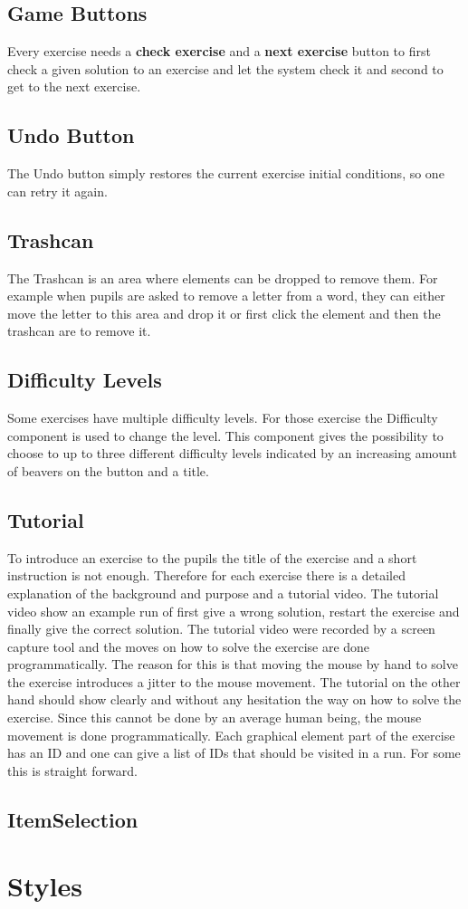 \subsection*{Game Buttons}
Every exercise needs a \textbf{check exercise} and a \textbf{next exercise} button to first check a given solution to an exercise and let the system check it and second to get to the next exercise.

\subsection*{Undo Button}
The Undo button simply restores the current exercise initial conditions, so one can retry it again.

\subsection*{Trashcan}
The Trashcan is an area where elements can be dropped to remove them. For example when pupils are asked to remove a letter from a word, they can either move the letter to this area and drop it or first click the element and then the trashcan are to remove it.

\subsection*{Difficulty Levels}
Some exercises have multiple difficulty levels. For those exercise the Difficulty component is used to change the level. This component gives the possibility to choose to up to three different difficulty levels indicated by an increasing amount of beavers on the button and a title.

\subsection*{Tutorial}
To introduce an exercise to the pupils the title of the exercise and a short instruction is not enough. Therefore for each exercise there is a detailed explanation of the background and purpose and a tutorial video. The tutorial video show an example run of first give a wrong solution, restart the exercise and finally give the correct solution.
The tutorial video were recorded by a screen capture tool and the moves on how to solve the exercise are done programmatically. The reason for this is that moving the mouse by hand to solve the exercise introduces a jitter to the mouse movement. The tutorial on the other hand should show clearly and without any hesitation the way on how to solve the exercise. Since this cannot be done by an average human being, the mouse movement is done programmatically. Each graphical element part of the exercise has an ID and one can give a list of IDs that should be visited in a run. For some this is straight forward.

\subsection*{ItemSelection}

\section{Styles}
\label{section:styles}
\TODO{}
